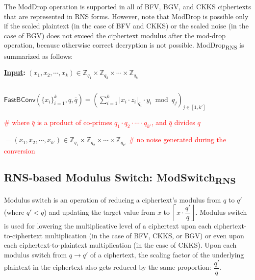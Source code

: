 The \textsf{ModDrop} operation is supported in all of BFV, BGV, and CKKS ciphertexts that are represented in RNS forms. However, note that \textsf{ModDrop} is possible only if the scaled plaintext (in the case of BFV and CKKS) or the scaled noise (in the case of BGV) does not exceed the ciphertext modulus after the mod-drop operation, because otherwise correct decryption is not possible. \textsf{ModDrop\textsubscript{RNS}} is summarized as follows:

\begin{tcolorbox}[title={\textbf{\tboxlabel{\ref*{subsec:rns-moddrop}} \textsf{ModDrop\textsubscript{RNS}}}}]


\textbf{\underline{Input}:} $(x_1, x_2, \cdots, x_k) \in \mathbb{Z}_{q_1} \times \mathbb{Z}_{q_2} \times \cdots \times \mathbb{Z}_{q_k}$ 

$ $

$\textsf{FastBConv}(\{x_i\}_{i=1}^{k}, q, \bar{q}) = \left( \sum\limits_{i=1}^{k} |x_i \cdot z_i|_{q_i} \cdot y_i \bmod q_j \right)_{j \in [1,k']}$  

\textcolor{red}{ \# where $\bar{q}$ is a product of co-primes $q_1 \cdot q_2 \cdot \cdots \cdot q_{k'}$, and $\bar{q}$ divides $q$} 


$ = (x_1, x_2, \cdots, x_{k'}) \in \mathbb{Z}_{q_1} \times \mathbb{Z}_{q_2} \times \cdots \times \mathbb{Z}_{q_{k'}}$ \textcolor{red}{ \# no noise generated during the conversion}


\end{tcolorbox}





\subsection{RNS-based Modulus Switch: \textsf{ModSwitch\textsubscript{RNS}}}
\label{subsec:rns-modswitch}

Modulus switch is an operation of reducing a ciphertext's modulus from $q$ to $q'$ (where $q' < q$) and updating the target value from $x$ to $\left\lceil x\cdot \dfrac{q'}{q}\right\rfloor$. Modulus switch is used for lowering the multiplicative level of a ciphertext upon each ciphertext-to-ciphertext multiplication (in the case of BFV, CKKS, or BGV) or even upon each ciphertext-to-plaintext multiplication (in the case of CKKS). Upon each modulus switch from $q \rightarrow q'$ of a ciphertext, the scaling factor of the underlying plaintext in the ciphertext also gets reduced by the same proportion: $\dfrac{q'}{q}$. 

